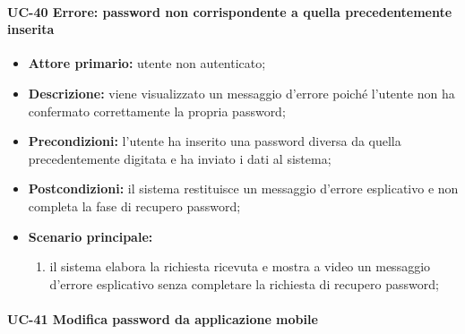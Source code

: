 \paragraph{UC-40 Errore: password non corrispondente a quella precedentemente inserita}

	\begin{itemize}
		\item \textbf{Attore primario:} utente non autenticato;

		\item \textbf{Descrizione:}  viene visualizzato un messaggio d'errore poiché l'utente non ha confermato correttamente la propria password;

		\item \textbf{Precondizioni:} l'utente ha inserito una password diversa da quella precedentemente digitata e ha inviato i dati al sistema;

		\item \textbf{Postcondizioni:} il sistema restituisce un messaggio d'errore esplicativo e non completa la fase di recupero password;

		\item \textbf{Scenario principale:}
	  		\begin{enumerate}
		  		\item il sistema elabora la richiesta ricevuta e mostra a video un messaggio d'errore esplicativo senza completare la richiesta di recupero password; 
	  		\end{enumerate}
	\end{itemize}

\paragraph{UC-41 Modifica password da applicazione mobile}

